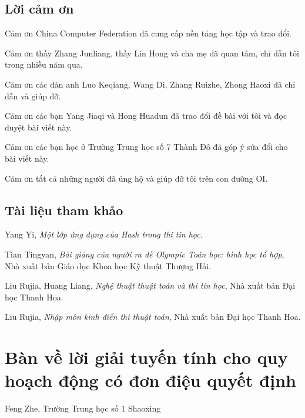 \documentclass[11pt]{article}
\begin{document}
\subsection{Lời cảm ơn}

Cảm ơn China Computer Federation đã cung cấp nền tảng học tập và trao đổi.

Cảm ơn thầy Zhang Junliang, thầy Lin Hong và cha mẹ đã quan tâm, chỉ dẫn tôi
trong nhiều năm qua.

Cảm ơn các đàn anh Luo Keqiang, Wang Di, Zhang Ruizhe, Zhong Haoxi đã chỉ dẫn
và giúp đỡ.

Cảm ơn các bạn Yang Jiaqi và Hong Huadun đã trao đổi đề bài với tôi và đọc
duyệt bài viết này.

Cảm ơn các bạn học ở Trường Trung học số 7 Thành Đô đã góp ý sửa đổi cho bài
viết này.

Cảm ơn tất cả những người đã ủng hộ và giúp đỡ tôi trên con đường OI.

\subsection*{Tài liệu tham khảo}

\begin{enumerate}[label={[\arabic*]}]
  \item Yang Yi, \emph{Một lớp ứng dụng của Hash trong thi tin học}.

  \item Tian Tingyan, \emph{Bài giảng của người ra đề Olympic Toán học: hình
  học tổ hợp}, Nhà xuất bản Giáo dục Khoa học Kỹ thuật Thượng Hải.

  \item Liu Rujia, Huang Liang, \emph{Nghệ thuật thuật toán và thi tin học},
  Nhà xuất bản Đại học Thanh Hoa.

  \item Liu Rujia, \emph{Nhập môn kinh điển thi thuật toán}, Nhà xuất bản Đại
  học Thanh Hoa.
\end{enumerate}

\section{Bàn về lời giải tuyến tính cho quy hoạch động có đơn điệu quyết định}

\begin{center}
Feng Zhe, Trường Trung học số 1 Shaoxing
\end{center}

\renewcommand{\abstractname}{Tóm tắt}
\begin{abstract}
Đơn điệu quyết định là một trong những dạng bài kinh điển trong quy hoạch
động. Trên cơ sở quy nạp các lời giải thường gặp, tác giả giới thiệu một thuật
toán tổng quát có thể giải loại bài này trong thời gian tuyến tính, rồi so
sánh nó với các thuật toán phi tuyến và thu được hiệu quả khá tốt.
\end{abstract}
\end{document}
